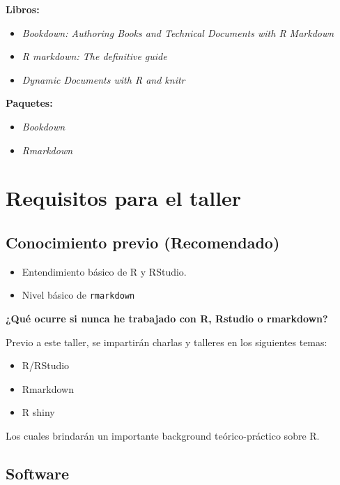 \documentclass[
]{book}
\providecommand{\tightlist}{%
  \setlength{\itemsep}{0pt}\setlength{\parskip}{0pt}}
\begin{document}
\textbf{Libros:}

\begin{itemize}
\tightlist
\item
  \emph{Bookdown: Authoring Books and Technical Documents with R Markdown} \citep{xie2016bookdown}
\item
  \emph{R markdown: The definitive guide} \citep{xie2018r}
\item
  \emph{Dynamic Documents with R and knitr} \citep{xie2015}
\end{itemize}

\textbf{Paquetes:}

\begin{itemize}
\tightlist
\item
  \emph{Bookdown} \citep{R-bookdown}
\item
  \emph{Rmarkdown} \citep{R-rmarkdown}
\end{itemize}

\hypertarget{requi}{%
\chapter{Requisitos para el taller}\label{requi}}

\hypertarget{conocimiento-previo-recomendado}{%
\section{Conocimiento previo (Recomendado)}\label{conocimiento-previo-recomendado}}

\begin{itemize}
\tightlist
\item
  Entendimiento básico de R y RStudio.
\item
  Nivel básico de \texttt{rmarkdown}
\end{itemize}

\textbf{¿Qué ocurre si nunca he trabajado con R, Rstudio o rmarkdown?}

Previo a este taller, se impartirán charlas y talleres en los siguientes temas:

\begin{itemize}
\tightlist
\item
  R/RStudio
\item
  Rmarkdown
\item
  R shiny
\end{itemize}

Los cuales brindarán un importante background teórico-práctico sobre R.

\hypertarget{software}{%
\section{Software}\label{software}}
\end{document}
